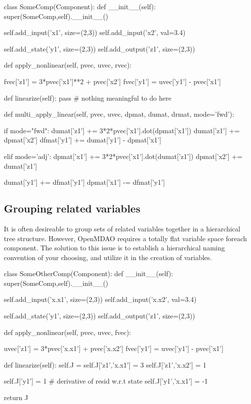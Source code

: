\documentclass[12pt]{article}
\begin{document}
\begin{pyglist}[language=python]
    class SomeComp(Component):
        def __init__(self):
            super(SomeComp,self).__init__()

            self.add_input('x1', size=(2,3))
            self.add_input('x2', val=3.4)

            self.add_state('y1', size=(2,3))
            self.add_output('z1', size=(2,3))

        def apply_nonlinear(self, pvec, uvec, rvec):

            fvec['z1'] = 3*pvec['x1']**2 + pvec['x2']
            fvec['y1'] = uvec['y1'] - pvec['x1']

        def linearize(self):
            pass # nothing meaningful to do here

        def multi_apply_linear(self, pvec, uvec, dpmat, dumat, drmat, mode='fwd'):

            if mode="fwd":
                dumat['z1'] += 3*2*pvec['x1'].dot(dpmat['x1'])
                dumat['z1'] += dpmat['x2']
                dfmat['y1'] += dumat['y1'] - dpmat['x1']

            elif mode='adj':
                dpmat['x1'] += 3*2*pvec['x1'].dot(dumat['z1'])
                dpmat['x2'] += dumat['z1']

                dumat['y1'] += dfmat['y1']
                dpmat['x1'] -= dfmat['y1']
\end{pyglist}

\subsection{Grouping related variables}
It is often desireable to group sets of related variables together in a hierarchical
tree structure. However, OpenMDAO requires a totally flat variable space foreach component.
The solution to this issue is to establish a hierarchical naming convention of your choosing, and
utilize it in the creation of variables.

\begin{pyglist}[language=python]
    class SomeOtherComp(Component):
        def __init__(self):
            super(SomeComp,self).__init__()

            self.add_input('x.x1', size=(2,3))
            self.add_input('x.x2', val=3.4)

            self.add_state('y1', size=(2,3))
            self.add_output('z1', size=(2,3))

        def apply_nonlinear(self, pvec, uvec, fvec):

            uvec['z1'] = 3*pvec['x.x1'] + pvec['x.x2']
            fvec['y1'] = uvec['y1'] - pvec['x1']

        def linearize(self):
            self.J = {}
            self.J['z1','x.x1'] = 3
            self.J['z1','x.x2'] = 1

            self.J['y1'] = 1 # derivative of resid w.r.t state
            self.J['y1','x.x1'] = -1

            return J
\end{pyglist}
\end{document}

